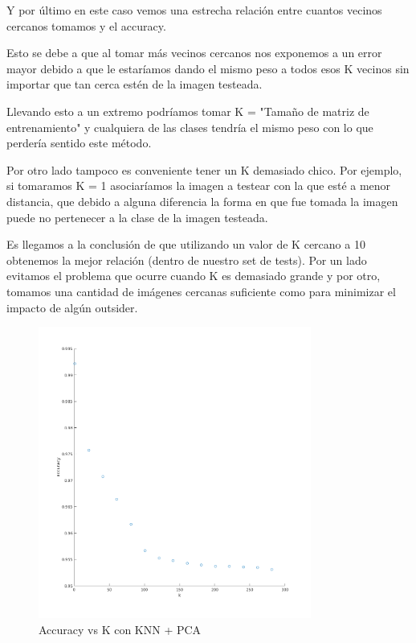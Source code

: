Y por último en este caso vemos una estrecha relación entre cuantos vecinos cercanos tomamos y el accuracy.

Esto se debe a que al tomar más vecinos cercanos nos exponemos a un error mayor debido a que le estaríamos dando el mismo peso a todos esos K vecinos sin importar que tan cerca estén de la imagen testeada.

Llevando esto a un extremo podríamos tomar K = "Tamaño de matriz de entrenamiento" y cualquiera de las clases tendría el mismo peso con lo que perdería sentido este método.

Por otro lado tampoco es conveniente tener un K demasiado chico. Por ejemplo, si tomaramos K = 1 asociaríamos la imagen a testear con la que esté a menor distancia, que debido a alguna diferencia la forma en que fue tomada la imagen puede no pertenecer a la clase de la imagen testeada.

Es llegamos a la conclusión de que utilizando un valor de K cercano a 10 obtenemos la mejor relación (dentro de nuestro set de tests).
Por un lado evitamos el problema que ocurre cuando K es demasiado grande y por otro, tomamos una cantidad de imágenes cercanas suficiente como para minimizar el impacto de algún outsider.
\begin{figure}[H]
	\centering
	\includegraphics[width=0.8\textwidth]{img/k_pca_accu.png}
	\caption{Accuracy vs K con KNN + PCA}
	\label{fig:K vs Accuracy con KNN + PCA}
\end{figure}
